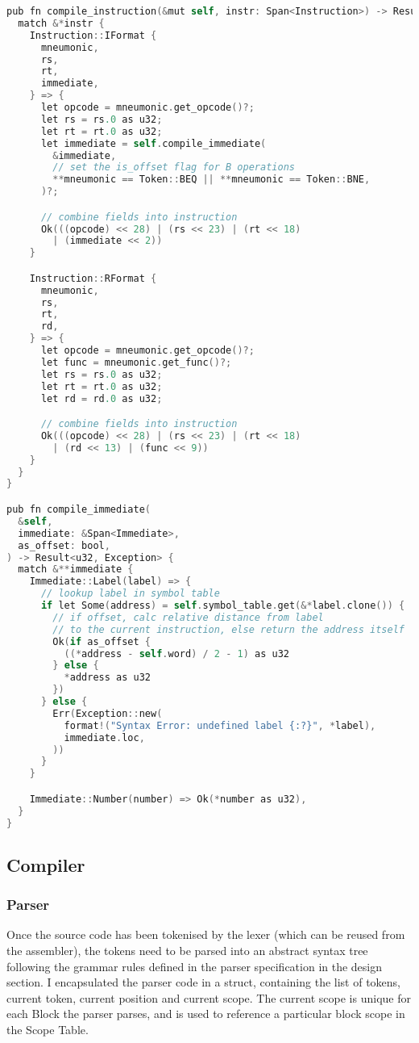 \begin{lstlisting}[language=C]
pub fn compile_instruction(&mut self, instr: Span<Instruction>) -> Result<u32, Exception> {
  match &*instr {
    Instruction::IFormat {
      mneumonic,
      rs,
      rt,
      immediate,
    } => {
      let opcode = mneumonic.get_opcode()?;
      let rs = rs.0 as u32;
      let rt = rt.0 as u32;
      let immediate = self.compile_immediate(
        &immediate,
        // set the is_offset flag for B operations
        **mneumonic == Token::BEQ || **mneumonic == Token::BNE,
      )?;

      // combine fields into instruction
      Ok(((opcode) << 28) | (rs << 23) | (rt << 18) 
        | (immediate << 2))
    }

    Instruction::RFormat {
      mneumonic,
      rs,
      rt,
      rd,
    } => {
      let opcode = mneumonic.get_opcode()?;
      let func = mneumonic.get_func()?;
      let rs = rs.0 as u32;
      let rt = rt.0 as u32;
      let rd = rd.0 as u32;

      // combine fields into instruction
      Ok(((opcode) << 28) | (rs << 23) | (rt << 18) 
        | (rd << 13) | (func << 9))
    }
  }
}

pub fn compile_immediate(
  &self,
  immediate: &Span<Immediate>,
  as_offset: bool,
) -> Result<u32, Exception> {
  match &**immediate {
    Immediate::Label(label) => {
      // lookup label in symbol table
      if let Some(address) = self.symbol_table.get(&*label.clone()) {
        // if offset, calc relative distance from label 
        // to the current instruction, else return the address itself
        Ok(if as_offset {
          ((*address - self.word) / 2 - 1) as u32
        } else {
          *address as u32
        })
      } else {
        Err(Exception::new(
          format!("Syntax Error: undefined label {:?}", *label),
          immediate.loc,
        ))
      }
    }

    Immediate::Number(number) => Ok(*number as u32),
  }
}
\end{lstlisting}

\subsection{Compiler}
\subsubsection{Parser}
Once the source code has been tokenised by the lexer (which can be reused from the assembler), the tokens need to be parsed into an abstract syntax tree following the grammar rules defined in the parser specification in the design section. I encapsulated the parser code in a struct, containing the list of tokens, current token, current position and current scope. The current scope is unique for each Block the parser parses, and is used to reference a particular block scope in the Scope Table. 

